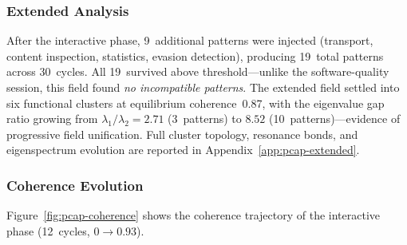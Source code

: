 \subsubsection{Extended Analysis}

After the interactive phase, 9~additional patterns were injected
(transport, content inspection, statistics, evasion detection),
producing 19~total patterns across 30~cycles.  All 19~survived above
threshold---unlike the software-quality session, this field found
\emph{no incompatible patterns}.  The extended field settled into six
functional clusters at equilibrium coherence~0.87, with the
eigenvalue gap ratio growing from $\lambda_1/\lambda_2 = 2.71$
(3~patterns) to $8.52$ (10~patterns)---evidence of progressive field
unification.  Full cluster topology, resonance bonds, and
eigenspectrum evolution are reported in
Appendix~\ref{app:pcap-extended}.

\subsubsection{Coherence Evolution}

Figure~\ref{fig:pcap-coherence} shows the coherence trajectory of the
interactive phase (12~cycles, $0 \to 0.93$).

